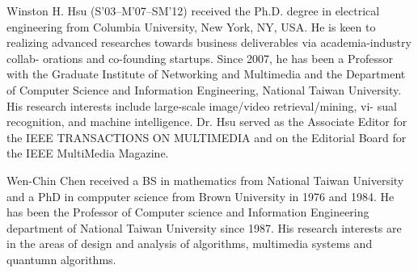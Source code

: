 \documentclass[journal]{IEEEtran}
\begin{document}
\begin{IEEEbiography}
{Winston H. Hsu}
(S’03–M’07–SM’12) received the Ph.D. degree in electrical engineering from Columbia University, New York, NY, USA. He is keen to realizing advanced researches towards business deliverables via academia-industry collab- orations and co-founding startups. Since 2007, he has been a Professor with the Graduate Institute of Networking and Multimedia and the Department of Computer Science and Information Engineering, National Taiwan University. His research interests include large-scale image/video retrieval/mining, vi-
sual recognition, and machine intelligence. Dr. Hsu served as the Associate Editor for the IEEE TRANSACTIONS ON MULTIMEDIA and on the Editorial Board for the IEEE MultiMedia Magazine.
\end{IEEEbiography}

\begin{IEEEbiography}
{Wen-Chin Chen}
received a BS in mathematics from National Taiwan University and a PhD in compputer science from Brown University in 1976 and 1984.
He has been the Professor of Computer science and Information Engineering department of National Taiwan University since 1987.
His research interests are in the areas of design and analysis of algorithms, multimedia systems and quantumn algorithms.
\end{IEEEbiography}

\vfill
\end{document}
